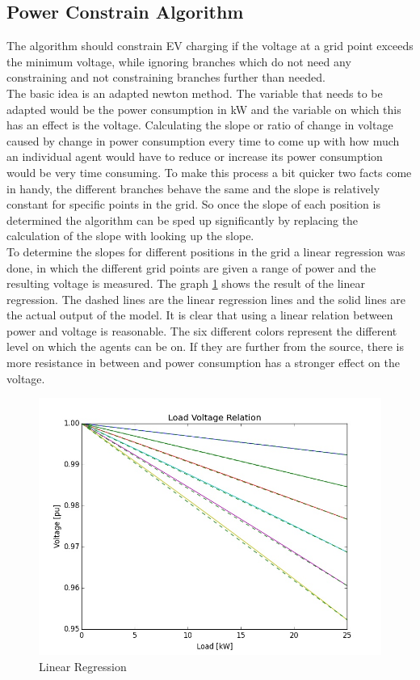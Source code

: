 \documentclass[a4paper]{article}
\begin{document}
\subsection{Power Constrain Algorithm}
The algorithm should  constrain EV charging if the voltage at a grid point exceeds the minimum voltage, while ignoring branches which do 
not need any constraining and not constraining branches further than needed. \\
The basic idea is an adapted newton method. The variable that needs to be adapted would be the power consumption in kW and the variable 
on which this has an effect is the voltage. Calculating the slope or ratio of change in voltage caused by change in power consumption
every time to come up with how much an individual agent would have to reduce or increase its power consumption would be very time 
consuming. To make this process a bit quicker two facts come in handy, the different branches behave the same and the slope is relatively 
constant for specific points in the grid. So once the slope of each position is determined the algorithm can be sped up significantly 
by replacing the calculation of the slope with looking up the slope. \\
To determine the slopes for different positions in the grid  a linear regression was done, in which the different grid points are 
given a range of power and the resulting voltage is measured. The graph \ref{load_voltage_graph} shows the result of the linear regression. 
The dashed lines are the linear regression lines and the solid lines are the actual output of the model. It is clear that using a linear
relation between power and voltage is reasonable. The six different colors represent the different level on which the agents
 can be on. If they are further from the source, there is more resistance in between and power consumption has a stronger effect on the 
 voltage.\\
\begin{figure}[!ht]
 \centering
 \includegraphics[width = \textwidth]{load_voltage.jpg}
 \caption{Linear Regression}
 \label{load_voltage_graph}
\end{figure}
\end{document}
